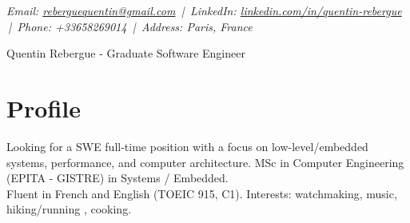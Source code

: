 \documentclass[9pt,a4paper]{article}
\newcommand{\namefont}{\fontsize{18}{22}\selectfont}
\newcommand{\tinyscript}{\fontsize{8}{8}\selectfont}
\begin{document}
\renewcommand\normalsize{\fontsize{10.5}{15}\selectfont}
\normalsize

\begin{center}
  {\tinyscript\itshape
  Email: \href{mailto:reberguequentin@gmail.com}{reberguequentin@gmail.com} \,|\,
  LinkedIn: \href{https://linkedin.com/in/quentin-rebergue}{linkedin.com/in/quentin-rebergue} \,|\,
  Phone: +33658269014 \,|\,
  Address: Paris, France}
\end{center}

\begin{center}
  {\namefont Quentin Rebergue - Graduate Software Engineer}
\end{center}

\section*{Profile}
\begin{tcolorbox}[mybox2]
Looking for a SWE full-time position with a focus on low-level/embedded systems, performance, and computer architecture. MSc in Computer Engineering (EPITA - GISTRE) in Systems / Embedded.\\[0.3em]
Fluent in French and English (TOEIC 915, C1). Interests: watchmaking, music, hiking/running , cooking.
\end{tcolorbox}
\end{document}
